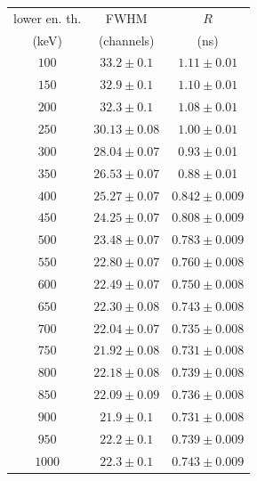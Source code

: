 \documentclass[a4paper]{article}
\begin{document}
\begin{table}[H]
\parbox{.45\linewidth}{
\centering
\begin{tabular}{|c|cc|}
  \hline
       lower en. th.  &  FWHM  & $R$ \\
       (keV) & (channels) & (ns)\\
      \hline
        $100$ & $33.2\pm 0.1$ & $1.11\pm0.01$\\
      $150$ & $32.9\pm0.1$ & $1.10\pm0.01$\\
      $200$  & $32.3\pm0.1$ & $1.08\pm0.01$\\
      $250$  & $30.13\pm0.08$ & $1.00\pm0.01$\\
      $300$  & $28.04\pm0.07$ & $0.93\pm$0.01\\
      $350$  & $26.53\pm0.07$ & $0.88\pm$0.01\\
      $400$  & $25.27\pm0.07$ & $0.842\pm0.009$\\
      $450$  & $24.25\pm0.07$ & $0.808\pm0.009$\\
      $500$  & $23.48\pm0.07$ & $0.783\pm0.009$\\
      $550$  & $22.80\pm0.07$ & $0.760\pm0.008$\\
      $600$  & $22.49\pm0.07$ & $0.750\pm0.008$\\
      $650$  & $22.30\pm0.08$ & $0.743\pm0.008$\\
      $700$  & $22.04\pm0.07$ & $0.735\pm0.008$\\
      $750$  & $21.92\pm0.08$ & $0.731\pm0.008$\\
      $800$  & $22.18\pm0.08$ & $0.739\pm0.008$\\
      $850$  & $22.09\pm0.09$ & $0.736\pm0.008$\\
      $900$  & $21.9\pm0.1$ & $0.731\pm0.008$\\
      $950$  & $22.2\pm0.1$ & $0.739\pm0.009$\\
      $1000$  & $22.3\pm0.1$ & $0.743\pm0.009$\\
     

\end{tabular}}
\end{table}
\end{document}
